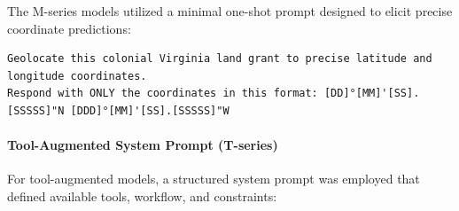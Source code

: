 The M-series models utilized a minimal one-shot prompt designed to
elicit precise coordinate predictions:

\begin{lstlisting}
Geolocate this colonial Virginia land grant to precise latitude and longitude coordinates.
Respond with ONLY the coordinates in this format: [DD]°[MM]'[SS].[SSSSS]"N [DDD]°[MM]'[SS].[SSSSS]"W
\end{lstlisting}

\paragraph{Tool-Augmented System Prompt
(T-series)}\label{a.2.2-tool-augmented-system-prompt-t-series}

For tool-augmented models, a structured system prompt was employed that
defined available tools, workflow, and constraints:

